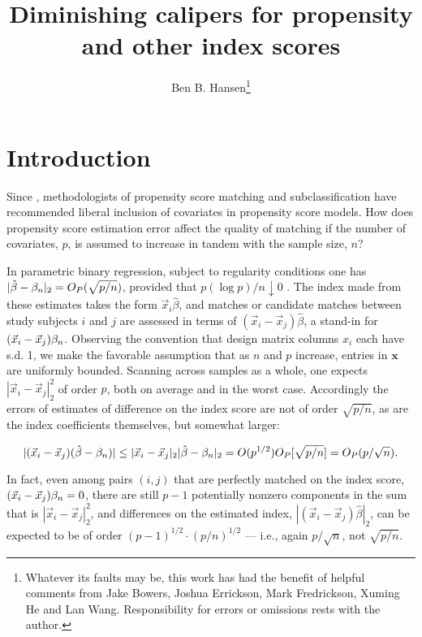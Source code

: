 \documentclass{article}
\author{Ben B. Hansen\thanks{Whatever its faults may be, this work has had the benefit of helpful comments from Jake Bowers, Joshua Errickson, Mark Fredrickson, Xuming He and Lan Wang. Responsibility for errors or omissions rests with the author.}}
\title{Diminishing calipers for propensity and other index scores}
\theoremstyle{remark}
\begin{document}
\maketitle

\section{Introduction} \label{sec:introduction}
Since \citet{rubin:thom:1996}, methodologists of propensity score
matching and subclassification have recommended liberal inclusion of
covariates in propensity score models. How does propensity score
estimation error affect the quality of matching if the number of
covariates, $p$, is assumed to increase in tandem with the sample size,
$n$? 

In parametric binary regression, subject to regularity conditions one
has $|\hat\beta - \beta_{n }|_2 = O_{P}(\sqrt{p/n})$, provided that
$p(\log p)/n \downarrow 0$ \citep{he2000parameters}. The index made from
these estimates takes the form $\vec{x}_i \hat\beta$, and matches or
candidate matches between study subjects $i$ and $j$ are assessed in
terms of $(\vec{x}_i -\vec{x}_j)\hat\beta$, a stand-in for
$(\vec{x}_i - \vec{x}_j)\beta_{n }$.  Observing the convention that 
design matrix columns $x_{i}$ each have s.d. 1, we make the favorable assumption
that as $n$ and $p$ increase, entries in $\mathbf{x}$ are
uniformly bounded. Scanning across samples as
a whole, one expects $|\vec{x}_i - \vec{x}_j|_2^2$ of order $p$, both on
average and in the worst case. Accordingly the errors of estimates of
difference on the index score are not of order $\sqrt{p/n}$, as are the
index coefficients themselves, but somewhat larger:

\begin{equation*}
|(\vec{x}_i -\vec{x}_j)(\hat\beta - \beta_{n })| \leq |\vec{x}_i -\vec{x}_j|_2 |\hat\beta - \beta_{n }|_2 = O(p^{1/2})O_P[\sqrt{p/n}] = O_P(p/\sqrt{n}) . 
\end{equation*}

In fact, even among pairs $(i,j)$ that are perfectly matched on the index score,
$(\vec{x}_i - \vec{x}_j)\beta_{n } = 0$, there are still $p-1$ potentially nonzero
components in the sum that is $|\vec{x}_i - \vec{x}_j|_2^2$, and
differences on the estimated index,
$|(\vec{x}_i - \vec{x}_j)\hat\beta|_2$, can be expected to be of order
$(p-1)^{1/2} \cdot (p/n)^{1/2}$ --- i.e., again $p/\sqrt{n}$, not $\sqrt{p/n}$.
\end{document}
